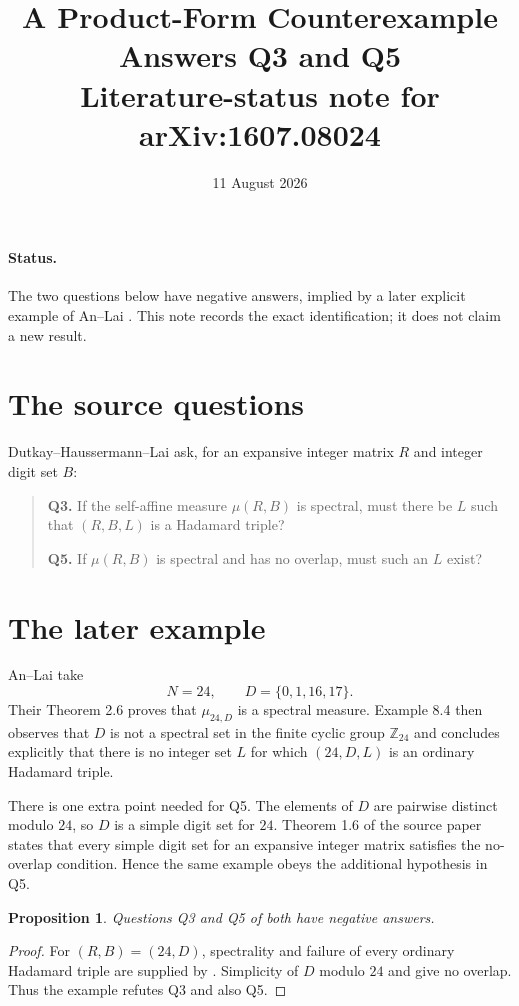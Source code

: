 \documentclass[10pt]{article}
\title{A Product-Form Counterexample Answers Q3 and Q5\\
\large Literature-status note for arXiv:1607.08024}
\author{}
\date{11 August 2026}
\newtheorem*{proposition}{Proposition}
\begin{document}
\maketitle

\paragraph{Status.}
The two questions below have negative answers, implied by a later explicit
example of An--Lai \cite{AL}.  This note records the exact identification; it
does not claim a new result.

\section*{The source questions}
Dutkay--Haussermann--Lai \cite[Section 10, Q3 and Q5, PDF p.~38]{DHL} ask,
for an expansive integer matrix $R$ and integer digit set $B$:
\begin{quote}
\textbf{Q3.} If the self-affine measure $\mu(R,B)$ is spectral, must there be
$L$ such that $(R,B,L)$ is a Hadamard triple?

\textbf{Q5.} If $\mu(R,B)$ is spectral and has no overlap, must such an $L$
exist?
\end{quote}

\section*{The later example}
An--Lai \cite[Example 8.4, PDF p.~33]{AL} take
\[
   N=24,\qquad D=\{0,1,16,17\}.
\]
Their Theorem 2.6 proves that $\mu_{24,D}$ is a spectral measure.  Example
8.4 then observes that $D$ is not a spectral set in the finite cyclic group
$\mathbb Z_{24}$ and concludes explicitly that there is no integer set
$L$ for which $(24,D,L)$ is an ordinary Hadamard triple.

There is one extra point needed for Q5.  The elements of $D$ are pairwise
distinct modulo $24$, so $D$ is a simple digit set for $24$.  Theorem 1.6 of
the source paper \cite[PDF p.~5]{DHL} states that every simple digit set for
an expansive integer matrix satisfies the no-overlap condition.  Hence the
same example obeys the additional hypothesis in Q5.

\begin{proposition}
Questions Q3 and Q5 of \cite{DHL} both have negative answers.
\end{proposition}
\begin{proof}
For $(R,B)=(24,D)$, spectrality and failure of every ordinary Hadamard triple
are supplied by \cite[Theorem 2.6 and Example 8.4]{AL}.  Simplicity of $D$
modulo $24$ and \cite[Theorem 1.6]{DHL} give no overlap.  Thus the example
refutes Q3 and also Q5.
\end{proof}
\end{document}
